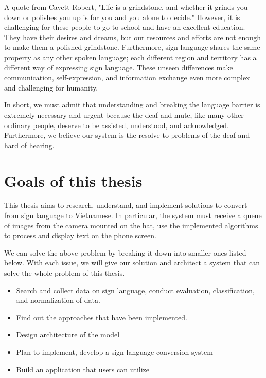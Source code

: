 A quote from Cavett Robert, "Life is a grindstone, and whether it grinds you down or polishes you up is for you and you alone to decide." However, it is challenging for these people to go to school and have an excellent education. They have their desires and dreams, but our resources and efforts are not enough to make them a polished grindstone. Furthermore, sign language shares the same property as any other spoken language; each different region and territory has a different way of expressing sign language. These unseen differences make communication, self-expression, and information exchange even more complex and challenging for humanity.

In short, we must admit that understanding and breaking the language barrier is extremely necessary and urgent because the deaf and mute, like many other ordinary people, deserve to be assisted, understood, and acknowledged. Furthermore, we believe our system is the resolve to problems of the deaf and hard of hearing.

\section{Goals of this thesis}

% 

This thesis aims to research, understand, and implement solutions to convert from sign language to Vietnamese. In particular, the system must receive a queue of images from the camera mounted on the hat, use the implemented algorithms to process and display text on the phone screen.

We can solve the above problem by breaking it down into smaller ones listed below. With each issue, we will give our solution and architect a system that can solve the whole problem of this thesis.
 
\begin{itemize}
	\item Search and collect data on sign language, conduct evaluation, classification, and normalization of data.
	\item Find out the approaches that have been implemented.
	\item Design architecture of the model
	\item Plan to implement, develop a sign language conversion system
	\item Build an application that users can utilize
\end{itemize}


